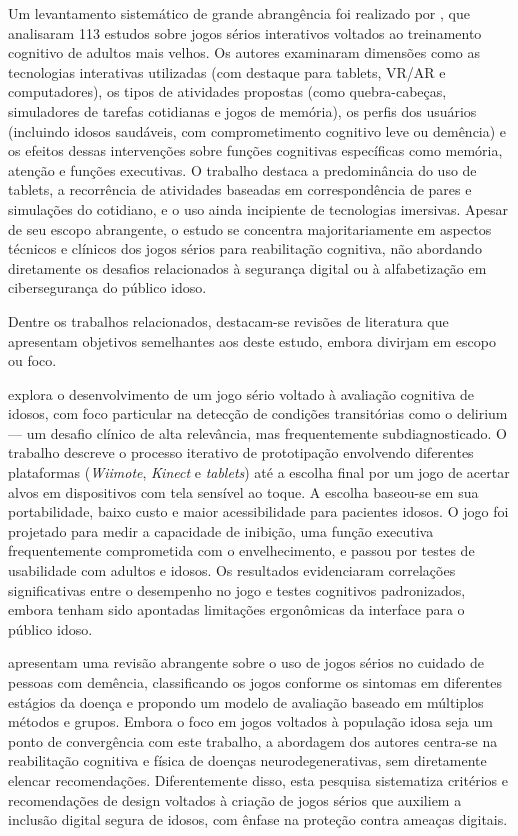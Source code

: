 Um levantamento sistemático de grande abrangência foi realizado por \cite{canapa2025interactive}, que analisaram 113 estudos sobre jogos sérios interativos voltados ao treinamento cognitivo de adultos mais velhos. Os autores examinaram dimensões como as tecnologias interativas utilizadas (com destaque para tablets, VR/AR e computadores), os tipos de atividades propostas (como quebra-cabeças, simuladores de tarefas cotidianas e jogos de memória), os perfis dos usuários (incluindo idosos saudáveis, com comprometimento cognitivo leve ou demência) e os efeitos dessas intervenções sobre funções cognitivas específicas como memória, atenção e funções executivas. O trabalho destaca a predominância do uso de tablets, a recorrência de atividades baseadas em correspondência de pares e simulações do cotidiano, e o uso ainda incipiente de tecnologias imersivas. Apesar de seu escopo abrangente, o estudo se concentra majoritariamente em aspectos técnicos e clínicos dos jogos sérios para reabilitação cognitiva, não abordando diretamente os desafios relacionados à segurança digital ou à alfabetização em cibersegurança do público idoso.

Dentre os trabalhos relacionados, destacam-se revisões de literatura que apresentam objetivos semelhantes aos deste estudo, embora divirjam em escopo ou foco.

\cite{tong2014cognitive} explora o desenvolvimento de um jogo sério voltado à avaliação cognitiva de idosos, com foco particular na detecção de condições transitórias como o delirium — um desafio clínico de alta relevância, mas frequentemente subdiagnosticado. O trabalho descreve o processo iterativo de prototipação envolvendo diferentes plataformas (\textit{Wiimote}, \textit{Kinect} e \textit{tablets}) até a escolha final por um jogo de acertar alvos em dispositivos com tela sensível ao toque. A escolha baseou-se em sua portabilidade, baixo custo e maior acessibilidade para pacientes idosos. O jogo foi projetado para medir a capacidade de inibição, uma função executiva frequentemente comprometida com o envelhecimento, e passou por testes de usabilidade com adultos e idosos. Os resultados evidenciaram correlações significativas entre o desempenho no jogo e testes cognitivos padronizados, embora tenham sido apontadas limitações ergonômicas da interface para o público idoso.

\cite{ning2020review} apresentam uma revisão abrangente sobre o uso de jogos sérios no cuidado de pessoas com demência, classificando os jogos conforme os sintomas em diferentes estágios da doença e propondo um modelo de avaliação baseado em múltiplos métodos e grupos. Embora o foco em jogos voltados à população idosa seja um ponto de convergência com este trabalho, a abordagem dos autores centra-se na reabilitação cognitiva e física de doenças neurodegenerativas, sem diretamente elencar recomendações. Diferentemente disso, esta pesquisa sistematiza critérios e recomendações de design voltados à criação de jogos sérios que auxiliem a inclusão digital segura de idosos, com ênfase na proteção contra ameaças digitais.

